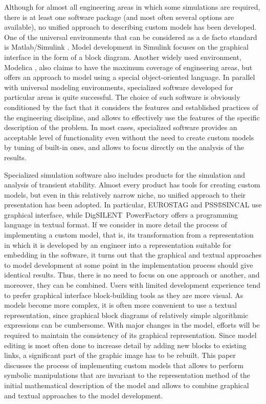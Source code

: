 \documentclass[lettersize,journal]{IEEEtran}
\begin{document}
Although for almost all engineering areas in which some simulations are required, there is at least one software package 
(and most often several options are available),  no unified approach to describing custom models has been developed. 
One of the universal environments that can be considered as a de facto standard is Matlab/Simulink \cite{sumulink}. Model development in Simulink 
focuses on the graphical interface in the form of a block diagram. Another widely used environment, Modelica \cite{modelica}, also claims to have 
the maximum coverage of engineering areas, but offers an approach to model using a special object-oriented language. 
In parallel with universal modeling environments, specialized software developed for particular areas is quite successful. 
The choice of such software is obviously conditioned by the fact that it considers the features and established practices of the engineering discipline, 
and allows to effectively use the features of the specific description of the problem. In most cases, specialized software 
provides an acceptable level of functionality even without the need to create custom models by tuning of built-in ones, and allows 
to focus directly on the analysis of the results.

Specialized simulation software also includes products for the simulation and analysis of transient stability.
Almost every product has tools for creating custom models, but even in this relatively narrow niche, no unified approach to their presentation 
has been adopted. In particular, EUROSTAG \cite{eurostag} and PSS®SINCAL \cite{sincal} use graphical interface, while \mbox{DigSILENT PowerFactory} \cite{powefactory} offers a programming language in textual format.
If we consider in more detail the process of implementing a custom model, that is, its transformation from a representation in which 
it is developed by an engineer into a representation suitable for embedding in the software, it turns out that the graphical and textual approaches 
to model development at some point in the implementation process should give identical results. Thus, there is no need to focus on one approach or another,
and moreover, they can be combined. Users with limited development experience tend to prefer graphical interface block-building tools as they are more visual. 
As models become more complex, it is often more convenient to use a textual representation, since graphical block diagrams of relatively simple algorithmic 
expressions can be cumbersome. With major changes in the model, efforts will be required to maintain the consistency of its graphical representation. 
Since model editing is most often done to increase detail by adding new blocks to existing links, a significant part of the graphic image has to be rebuilt.
This paper discusses the process of implementing custom models that allows to perform symbolic manipulations that are invariant to the representation method
of the initial mathematical description of the model and allows to combine graphical and textual approaches to the model development.
\end{document}
